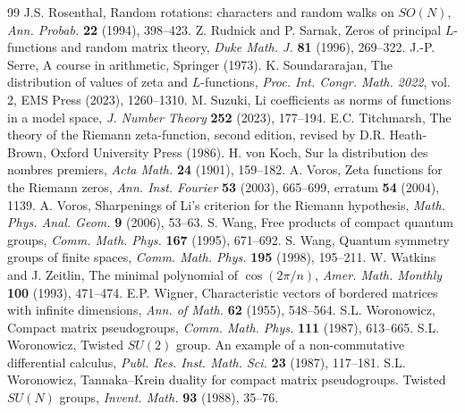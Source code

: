\documentclass[11pt,a4paper]{article}
\begin{document}
\begin{thebibliography}{99}
 J.S. Rosenthal, Random rotations: characters and random walks on $SO(N)$, \textit{Ann. Probab.} \textbf{22} (1994), 398--423.
 Z. Rudnick and P. Sarnak, Zeros of principal $L$-functions and random matrix theory, \textit{Duke Math. J.} \textbf{81} (1996), 269--322.
 J.-P. Serre, A course in arithmetic, Springer (1973).
 K. Soundararajan, The distribution of values of zeta and $L$-functions, \textit{Proc. Int. Congr. Math. 2022}, vol. 2, EMS Press (2023), 1260--1310.
 M. Suzuki, Li coefficients as norms of functions in a model space, \textit{J. Number Theory} \textbf{252} (2023), 177--194.
 E.C. Titchmarsh, The theory of the Riemann zeta-function, second edition, revised by D.R. Heath-Brown, Oxford University Press (1986).
 H. von Koch, Sur la distribution des nombres premiers, \textit{Acta Math.} \textbf{24} (1901), 159--182.
 A. Voros, Zeta functions for the Riemann zeros, \textit{Ann. Inst. Fourier} \textbf{53} (2003), 665--699, erratum \textbf{54} (2004), 1139.
 A. Voros, Sharpenings of Li's criterion for the Riemann hypothesis, \textit{Math. Phys. Anal. Geom.} \textbf{9} (2006), 53--63.
 S. Wang, Free products of compact quantum groups, \textit{Comm. Math. Phys.} \textbf{167} (1995), 671--692.
 S. Wang, Quantum symmetry groups of finite spaces, \textit{Comm. Math. Phys.} \textbf{195} (1998), 195--211.
 W. Watkins and J. Zeitlin, The minimal polynomial of $\cos(2\pi/n)$, \textit{Amer. Math. Monthly} \textbf{100} (1993), 471--474.
 E.P. Wigner, Characteristic vectors of bordered matrices with infinite dimensions, \textit{Ann. of Math.} \textbf{62} (1955), 548--564.
 S.L. Woronowicz, Compact matrix pseudogroups, \textit{Comm. Math. Phys.} \textbf{111} (1987), 613--665.
 S.L. Woronowicz, Twisted $SU(2)$ group. An example of a non-commutative differential calculus, \textit{Publ. Res. Inst. Math. Sci.} \textbf{23} (1987), 117--181.
 S.L. Woronowicz, Tannaka--Krein duality for compact matrix pseudogroups. Twisted $SU(N)$ groups, \textit{Invent. Math.} \textbf{93} (1988), 35--76.
\end{thebibliography}
\end{document}

